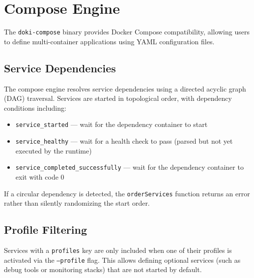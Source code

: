 \section{Compose Engine}
\label{sec:compose-engine}

The \texttt{doki-compose} binary provides Docker Compose compatibility,
allowing users to define multi-container applications using YAML
configuration files.

\subsection{Service Dependencies}
\label{sec:service-dependencies}

The compose engine resolves service dependencies using a directed
acyclic graph (DAG) traversal. Services are started in topological
order, with dependency conditions including:

\begin{itemize}[leftmargin=*, itemsep=3pt]
  \item \texttt{service\_started} --- wait for the dependency container
        to start
  \item \texttt{service\_healthy} --- wait for a health check to pass
        (parsed but not yet executed by the runtime)
  \item \texttt{service\_completed\_successfully} --- wait for the
        dependency container to exit with code 0
\end{itemize}

If a circular dependency is detected, the \texttt{orderServices}
function returns an error rather than silently randomizing the start
order.

\subsection{Profile Filtering}
\label{sec:profile-filtering}

Services with a \texttt{profiles} key are only included when one of
their profiles is activated via the \texttt{--profile} flag. This
allows defining optional services (such as debug tools or monitoring
stacks) that are not started by default.

